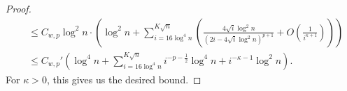 \documentclass[EJP]{ejpecp} %
\begin{document}
\begin{proof}
\begin{align*}
		&\le C_{w, p} \log^2 n \cdot \left( \log^2 n + \sum_{i = 16 \log^4 n}^{K \sqrt{n} } \left( 
		\frac{4 \sqrt{ i } \log^2 n }{\left(2 i - 4 \sqrt{ i } \log^2 n\right)^{p + 1}} 
		+ O\left( \frac{1}{i^{\kappa + 1}} \right)
		\right) \right)  \\
		&\le C_{w, p}' \left(\log^4 n + \sum_{i = 16 \log^4 n}^{K \sqrt{n} } i^{- p - \frac{1}{2}} \log^4 n + i^{- \kappa - 1 } \log^2 n \right)
		.\end{align*} 
	For $\kappa>0$, this gives us the desired bound.
\end{proof}
\end{document}
